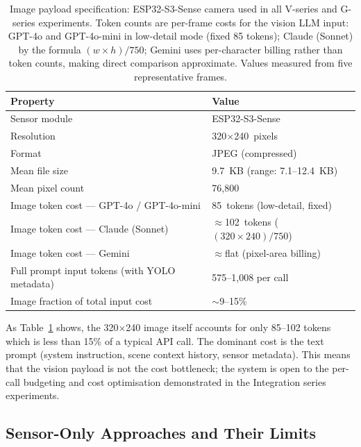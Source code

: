 \begin{table}[ht]
  \caption{Image payload specification: ESP32-S3-Sense camera used in all
    V-series and G-series experiments. Token counts are per-frame costs for the
    vision LLM input: GPT-4o and GPT-4o-mini in low-detail mode (fixed 85
    tokens); Claude (Sonnet) by the formula $(w \times h)/750$; Gemini uses
    per-character billing rather than token counts, making direct comparison
    approximate. Values measured from five representative frames.}
  \label{tab:ch2_image_spec}
  \centering
  \small
  \begin{tabular}{ll}
    \toprule
    Property & Value \\
    \midrule
    Sensor module & ESP32-S3-Sense \\
    Resolution & 320$\times$240~pixels \\
    Format & JPEG (compressed) \\
    Mean file size & 9.7~KB (range: 7.1--12.4~KB) \\
    Mean pixel count & 76,800 \\
    \midrule
    Image token cost --- GPT-4o / GPT-4o-mini & 85~tokens (low-detail, fixed) \\
    Image token cost --- Claude (Sonnet) & $\approx$102~tokens ($(320 \times 240)/750$) \\
    Image token cost --- Gemini & $\approx$flat (pixel-area billing) \\
    \midrule
    Full prompt input tokens (with YOLO metadata) & 575--1,008 per call \\
    Image fraction of total input cost & $\sim$9--15\% \\
    \bottomrule
  \end{tabular}
\end{table}

As Table~\ref{tab:ch2_image_spec} shows, the 320$\times$240 image itself accounts for only 85--102 tokens which is less than 15\% of a typical API call.
The dominant cost is the text prompt (system instruction, scene context history, sensor metadata). 
This means that the vision payload is not the cost bottleneck; the system is open to the per-call budgeting and cost optimisation demonstrated in the Integration series experiments.

\subsection{Sensor-Only Approaches and Their Limits}
\label{sec:ch2_problem_sensors}

